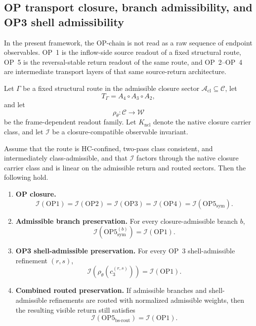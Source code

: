 \subsection{OP transport closure, branch admissibility, and OP3 shell admissibility}
\label{sec:compressed-op-branch-shell}

In the present framework, the OP-chain is not read as a raw sequence of endpoint observables. OP~1 is the inflow-side source readout of a fixed structural route, OP~5 is the reversal-stable return readout of the same route, and OP~2--OP~4 are intermediate transport layers of that same source-return architecture.

Let $\Gamma$ be a fixed structural route in the admissible closure sector $\mathcal{A}_{\mathrm{cl}}\subseteq\mathcal{C}$, let
\[
T_{\Gamma}=A_{4}\circ A_{3}\circ A_{2},
\]
and let
\[
\rho_{\theta}:\mathcal{C}\to\mathcal{W}
\]
be the frame-dependent readout family. Let $K_{\mathrm{ncl}}$ denote the native closure carrier class, and let $\mathcal{I}$ be a closure-compatible observable invariant.

\begin{theorem}
\label{thm:compressed-op-branch-shell}
Assume that the route is HC-confined, two-pass class consistent, and intermediately class-admissible, and that $\mathcal{I}$ factors through the native closure carrier class and is linear on the admissible return and routed sectors. Then the following hold.
\begin{enumerate}[leftmargin=2em,label=(\roman*)]
\item \textbf{OP closure.}
\[
\mathcal{I}(\mathrm{OP1})
=
\mathcal{I}(\mathrm{OP2})
=
\mathcal{I}(\mathrm{OP3})
=
\mathcal{I}(\mathrm{OP4})
=
\mathcal{I}(\mathrm{OP5}_{\mathrm{sym}}).
\]
\item \textbf{Admissible branch preservation.} For every closure-admissible branch $b$,
\[
\mathcal{I}(\mathrm{OP5}^{(b)}_{\mathrm{sym}})=\mathcal{I}(\mathrm{OP1}).
\]
\item \textbf{OP3 shell-admissible preservation.} For every OP~3 shell-admissible refinement $(r,s)$,
\[
\mathcal{I}(\rho_{\theta}(c_{3}^{(r,s)}))=\mathcal{I}(\mathrm{OP1}).
\]
\item \textbf{Combined routed preservation.} If admissible branches and shell-admissible refinements are routed with normalized admissible weights, then the resulting visible return still satisfies
\[
\mathcal{I}(\mathrm{OP5}_{\mathrm{bs\text{-}rout}})=\mathcal{I}(\mathrm{OP1}).
\]
\end{enumerate}
\end{theorem}

